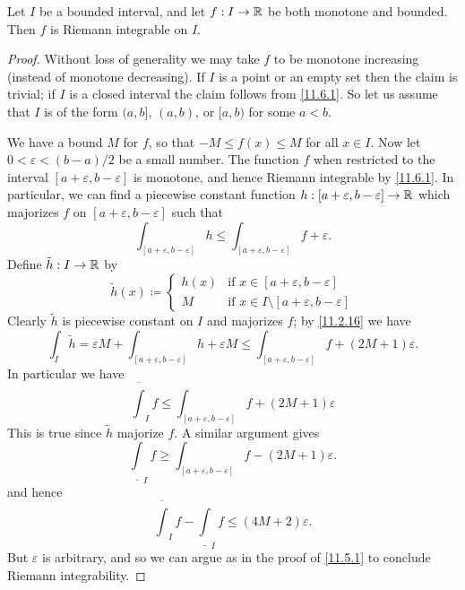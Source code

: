 \begin{cor}\label{11.6.3}
  Let \(I\) be a bounded interval, and let \(f : I \to \mathbb{R}\) be both monotone and bounded.
  Then \(f\) is Riemann integrable on \(I\).
\end{cor}

\begin{proof}
  Without loss of generality we may take \(f\) to be monotone increasing (instead of monotone decreasing).
  If \(I\) is a point or an empty set then the claim is trivial;
  if \(I\) is a closed interval the claim follows from \cref{11.6.1}.
  So let us assume that \(I\) is of the form \((a, b]\), \((a, b)\), or \([a, b)\) for some \(a < b\).

  We have a bound \(M\) for \(f\), so that \(-M \leq f(x) \leq M\) for all \(x \in I\).
  Now let \(0 < \varepsilon < (b - a) / 2\) be a small number.
  The function \(f\) when restricted to the interval \([a + \varepsilon, b - \varepsilon]\) is monotone, and hence Riemann integrable by \cref{11.6.1}.
  In particular, we can find a piecewise constant function \(h : [a + \varepsilon, b - \varepsilon] \to \mathbb{R}\) which majorizes \(f\) on \([a + \varepsilon, b - \varepsilon]\) such that
  \[
    \int_{[a + \varepsilon, b - \varepsilon]} h \leq \int_{[a + \varepsilon, b - \varepsilon]} f + \varepsilon.
  \]
  Define \(\tilde{h} : I \to \mathbb{R}\) by
  \[
    \tilde{h}(x) \coloneqq \begin{cases}
      h(x) & \text{if } x \in [a + \varepsilon, b - \varepsilon]             \\
      M    & \text{if } x \in I \setminus [a + \varepsilon, b - \varepsilon]
    \end{cases}
  \]
  Clearly \(\tilde{h}\) is piecewise constant on \(I\) and majorizes \(f\);
  by \cref{11.2.16} we have
  \[
    \int_I \tilde{h} = \varepsilon M + \int_{[a + \varepsilon, b - \varepsilon]} h + \varepsilon M \leq \int_{[a + \varepsilon, b - \varepsilon]} f + (2M + 1) \varepsilon.
  \]
  In particular we have
  \[
    \overline{\int}_I f \leq \int_{[a + \varepsilon, b - \varepsilon]} f + (2M + 1) \varepsilon
  \]
  This is true since \(\tilde{h}\) majorize \(f\).
  A similar argument gives
  \[
    \underline{\int}_I f \geq \int_{[a + \varepsilon, b - \varepsilon]} f - (2M + 1) \varepsilon.
  \]
  and hence
  \[
    \overline{\int}_I f - \underline{\int}_I f \leq (4M + 2) \varepsilon.
  \]
  But \(\varepsilon\) is arbitrary, and so we can argue as in the proof of \cref{11.5.1} to conclude Riemann integrability.
\end{proof}

